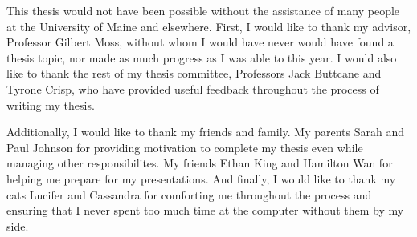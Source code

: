 \begin{acknowledgements}
  This thesis would not have been possible without the assistance of many people at the University of Maine and elsewhere.
  First, I would like to thank my advisor, Professor Gilbert Moss, without whom I would have never would have found a thesis topic, nor made as much progress as I was able to this year.
  I would also like to thank the rest of my thesis committee, Professors Jack Buttcane and Tyrone Crisp, who have provided useful feedback throughout the process of writing my thesis.

  Additionally, I would like to thank my friends and family.
  My parents Sarah and Paul Johnson for providing motivation to complete my thesis even while managing other responsibilites.
  My friends Ethan King and Hamilton Wan for helping me prepare for my presentations.
  And finally, I would like to thank my cats Lucifer and Cassandra for comforting me throughout the process and ensuring that I never spent too much time at the computer without them by my side.
\end{acknowledgements}

\tableofcontents


\mainmatter

\endinput
